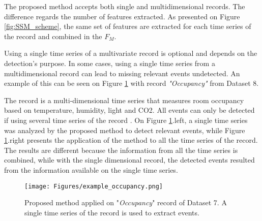 The proposed method accepts both single and multidimensional records. The difference regards the number of features extracted. As presented on Figure \ref{fig:SSM_scheme}, the same set of features are extracted for each time series of the record and combined in the $F_M$. 
\par
Using a single time series of a multivariate record is optional and depends on the detection's purpose. In some cases, using a single time series from a multidimensional record can lead to missing relevant events undetected. An example of this can be seen on Figure \ref{fig:occupancy_uni} with record \textit{"Occupancy"} from Dataset 8. 
\par
The record is a multi-dimensional time series that measures room occupancy based on temperature, humidity, light and CO2. All events can only be detected if using several time series of the record \cite{cpd_alan}. On Figure \ref{fig:occupancy_uni}.left, a single time series was analyzed by the proposed method to detect relevant events, while Figure \ref{fig:occupancy_uni}.right presents the application of the method to all the time series of the record. The results are different because the information from all the time series is combined, while with the single dimensional record, the detected events resulted from the information available on the single time series.\\

\begin{figure}
    \centering
    \texttt{[image: Figures/example\_occupancy.png]}
    \caption{Proposed method applied on "\textit{Occupancy}" record of Dataset 7. A single time series of the record is used to extract events.}
    \label{fig:occupancy_uni}
\end{figure}




